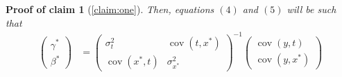 \documentclass[10pt]{article}
\newtheorem{claimproof}{Proof of claim}[claim]
\begin{document}
\begin{claimproof}[\ref{claim:one}]

Then, equations $(4)$ and $(5)$ will be such that
            \begin{align}
                    \left(\begin{array}{l}
                {\gamma}^* \\
                {\beta}^*
                \end{array}\right)&=\left(\begin{array}{cc}
                {\sigma}^2_{t} & \operatorname{cov}({t,x^*}) \\
                \operatorname{cov}({x^*,t}) & {\sigma}_{x^*}^2
                \end{array}\right)^{-1}\left(\begin{array}{c}
                \operatorname{cov}{(y,t)} \\
                \operatorname{cov}{(y,x^*)}
                \end{array}\right) \\
                \end{align}
           
\end{claimproof}	
 
\end{document}
